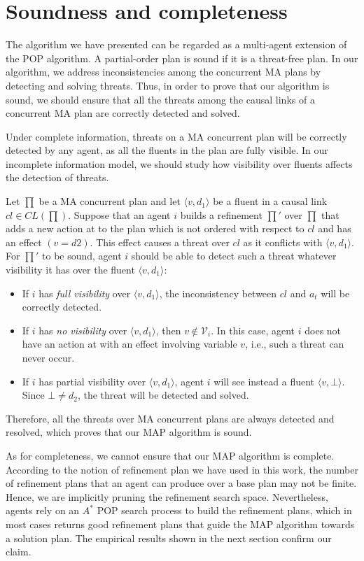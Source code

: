 \documentclass[12pt]{article}
\begin{document}
\section{Soundness and completeness}

The algorithm we have presented can be regarded as a multi-agent extension of the POP algorithm.
A partial-order plan is sound if it is a threat-free plan.
In our algorithm, we address inconsistencies among the concurrent MA plans by detecting and solving threats.
Thus, in order to prove that our algorithm is sound, we should ensure that all the threats among the causal links of a concurrent MA plan are correctly detected and solved.

Under complete information, threats on a MA concurrent plan will be correctly detected by any agent, as all the fluents in the plan are fully visible.
In our incomplete information model, we should study how visibility over fluents affects the detection of threats.

Let $\prod$ be a MA concurrent plan and let $\langle v,d_1\rangle$ be a fluent in a causal link $cl \in CL(\prod)$.
Suppose that an agent $i$ builds a refinement $\prod'$ over $\prod$ that adds a new action at to the plan which is not ordered with respect to $cl$ and has an effect $(v = d2)$.
This effect causes a threat over $cl$ as it conflicts with $\langle v,d_1\rangle$.
For $\prod'$ to be sound, agent $i$ should be able to detect such a threat whatever visibility it has over the fluent $\langle v,d_1\rangle$:

\begin{itemize}
  \item If $i$ has \textit{full visibility} over $\langle v,d_1\rangle$, the inconsistency between $cl$ and $a_t$ will be correctly detected.
  \item If $i$ has \textit{no visibility} over $\langle v,d_1\rangle$, then $v \notin \mathcal{V}_i$.
In this case, agent $i$ does not have an action at with an effect involving variable $v$, i.e., such a threat can never occur.
  \item If $i$ has partial visibility over $\langle v,d_1\rangle$, agent $i$ will see instead a fluent $\langle v,\bot\rangle$.
Since $\bot\neq d_2$, the threat will be detected and solved.
\end{itemize}

Therefore, all the threats over MA concurrent plans are always detected and resolved, which proves that our MAP algorithm is sound.

As for completeness, we cannot ensure that our MAP algorithm is complete.
According to the notion of refinement plan we have used in this work, the number of refinement plans that an agent can produce over a base plan may not be finite.
Hence, we are implicitly pruning the refinement search space.
Nevertheless, agents rely on an $A^\ast$ POP search process to build the refinement plans, which in most cases returns good refinement plans that guide the MAP algorithm towards a solution plan.
The empirical results shown in the next section confirm our claim.
\end{document}
